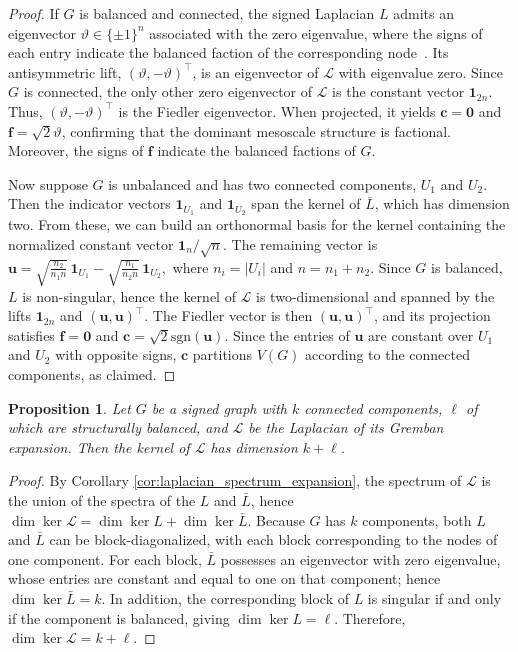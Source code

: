 \documentclass[reprint,onecolumn]{article}
\newtheorem{proposition}[theorem]{Proposition}
\newcommand{\mc}[1]{\mathcal{#1}}
\newcommand{\1}{\mathbb{1}}
\renewcommand{\c}{\mathbf{c}}
\newcommand{\f}{\mathbf{f}}
\newcommand{\0}{\mathbf{0}}
\newcommand{\sgn}{\textrm{sgn}}
\begin{document}
\begin{proof}
If $G$ is balanced and connected, the signed Laplacian \( L \) admits an eigenvector \(\vartheta \in \{\pm1\}^n \) associated with the zero eigenvalue, where the signs of each entry indicate the balanced faction of the corresponding node~\cite{kunegis2010spectral}. Its antisymmetric lift, \( (\vartheta, -\vartheta)^\top \), is an eigenvector of \( \mc L \) with eigenvalue zero. Since \( G \) is connected, the only other zero eigenvector of \( \mc L \) is the constant vector \( \mathbf{1}_{2n} \). Thus, \( (\vartheta, -\vartheta)^\top \) is the Fiedler eigenvector. When projected, it yields \( \c = \0 \) and \( \f = \sqrt{2}\vartheta \), confirming that the dominant mesoscale structure is factional. Moreover, the signs of $\f$ indicate the balanced factions of $G$.

Now suppose $G$ is unbalanced and has two connected components, \( U_1 \) and \( U_2 \). Then the indicator vectors \( \mathbf{1}_{U_1} \) and \( \mathbf{1}_{U_2} \) span the kernel of \( \bar L \), which has dimension two. From these, we can build an orthonormal basis for the kernel containing the normalized constant vector \( \mathbf{1}_n / \sqrt{n} \). The remaining vector is
\(
\mathbf{u} = \sqrt{\frac{n_2}{n_1 n}} \, \mathbf{1}_{U_1} - \sqrt{\frac{n_1}{n_2 n}} \, \mathbf{1}_{U_2},
\)
where \( n_i = |U_i| \) and \( n = n_1 + n_2 \). Since $G$ is balanced, $L$ is non-singular, hence the kernel of $\mc L$ is two-dimensional and spanned by the lifts \( \mathbf{1}_{2n} \) and \( (\mathbf{u}, \mathbf{u})^\top \). The Fiedler vector is then \( (\mathbf{u}, \mathbf{u})^\top \), and its projection satisfies \( \f = \0 \) and
\(
\c = \sqrt{2} \sgn(\mathbf{u}).
\)
Since the entries of \( \mathbf{u} \) are constant over \( U_1 \) and \( U_2 \) with opposite signs, \( \c \) partitions \( V(G) \) according to the connected components, as claimed.
\end{proof}

\begin{proposition}
Let \( G  \) be a signed graph with \( k \) connected components, \( \ell \) of which are structurally balanced, and \( \mc L \) be the Laplacian of its Gremban expansion. Then the kernel of \( \mc L \) has dimension \( k + \ell \).
\end{proposition}

\begin{proof}
By Corollary \ref{cor:laplacian_spectrum_expansion}, the spectrum of \( \mc L \) is the union of the spectra of the \( L \) and \( \bar L \), hence $\dim \ker \mc L = \dim \ker L + \dim \ker \bar L$. Because $G$ has $k$ components, both $L$ and $\bar L$ can be block-diagonalized, with each block corresponding to the nodes of one component. For each block, $\bar L$ possesses an eigenvector with zero eigenvalue, whose entries are constant and equal to one on that component; hence $\dim \ker \bar L = k$. In addition, the corresponding block of $L$ is singular if and only if the component is balanced, giving $\dim \ker L = \ell$. Therefore, $\dim \ker \mc L = k+\ell$.
\end{proof}
\end{document}
